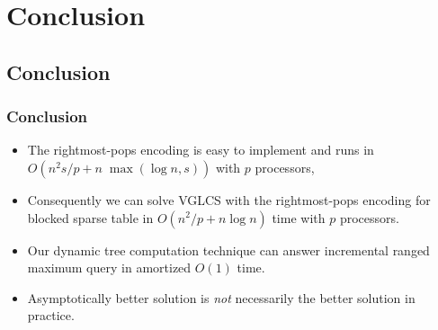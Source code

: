 \section{Conclusion}

\subsection{Conclusion}
\begin{frame}
  \frametitle{Conclusion}
  \begin{itemize}
    \item The rightmost-pops encoding is easy to implement and runs in
      $O(n^2 s/p+n\;\max(\log n, s))$ with $p$ processors,
    \item Consequently we can solve VGLCS with the rightmost-pops
      encoding for blocked sparse table in $O(n^2/p+n\log n)$ time
      with $p$ processors.
    \item Our dynamic tree computation technique can answer
      incremental ranged maximum query in amortized $O(1)$ time.
    \item Asymptotically better solution is {\em not} necessarily the
      better solution in practice.
  \end{itemize}
\end{frame}
